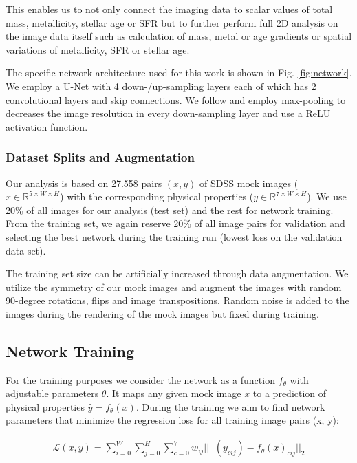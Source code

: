 \documentclass[conference]{IEEEtran}
\begin{document}
This enables us to not only connect the imaging data to scalar values of total mass, metallicity, stellar age or SFR but to further perform full 2D analysis on the image data itself such as calculation of mass, metal or age gradients or spatial variations of metallicity, SFR or stellar age.

The specific network architecture used for this work is shown in Fig. \ref{fig:network}. We employ a U-Net with 4 down-/up-sampling layers each of which has 2 convolutional layers and skip connections. We follow \cite{Ronneberger2015} and employ max-pooling to decreases the image resolution in every down-sampling layer and use a ReLU activation function.

\subsubsection{Dataset Splits and Augmentation}

Our analysis is based on 27.558 pairs $(x, y)$ of SDSS mock images ($x \in \mathbb{R}^{5 \times W \times H}$) with the corresponding physical properties ($y \in \mathbb{R}^{7 \times W \times H}$). We use 20\% of all images for our analysis (test set) and the rest for network training. From the training set, we again reserve 20\% of all image pairs for validation and selecting the best network during the training run (lowest loss on the validation data set).

The training set size can be artificially increased through data augmentation. We utilize the symmetry of our mock images and augment the images with random 90-degree rotations, flips and image transpositions. Random noise is added to the images during the rendering of the mock images but fixed during training.

\subsection{Network Training}

For the training purposes we consider the network as a function $f_\theta$ with adjustable parameters $\theta$. It maps any given mock image $x$ to a prediction of physical properties $\hat{y} = f_\theta(x)$. During the training we aim to find network parameters that minimize the regression loss for all training image pairs (x, y):

\begin{align}
    \mathcal{L}(x,y) =  \sum_{i=0}^W \sum_{j=0}^H \sum_{c=0}^7 w_{ij} || \mathop{\log_{10}}(y_{cij}) - f_\theta(x)_{cij} ||_2
\end{align}
\end{document}
